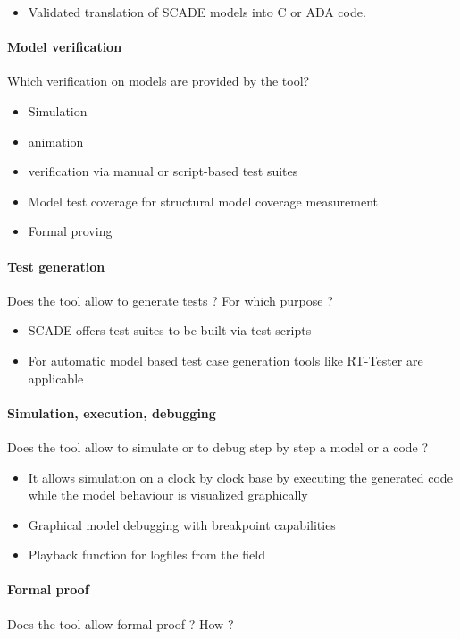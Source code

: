 \begin{itemize}
	\item Validated translation of SCADE models into C or ADA code.
\end{itemize}

\paragraph{Model verification}
Which verification on models are provided by the tool?

\begin{itemize}
	\item Simulation
	\item animation
	\item verification via manual or script-based test suites
	\item Model test coverage for structural model coverage measurement
	\item Formal proving
\end{itemize}

\paragraph{Test generation}
Does the tool allow to generate tests ? For  which purpose ?

\begin{itemize}
	\item SCADE offers test suites to be built via test scripts
	\item For automatic model based test case generation tools like RT-Tester are applicable
\end{itemize}

\paragraph{Simulation, execution, debugging}
Does the tool allow to simulate or to debug step by step a model or a code ?

\begin{itemize}
	\item It allows simulation on a clock by clock base by executing the generated code while the model behaviour is visualized graphically
	\item Graphical model debugging with breakpoint capabilities
	\item Playback function for logfiles from the field
\end{itemize}

\paragraph{Formal proof}
Does the tool allow formal proof ?  How ?


